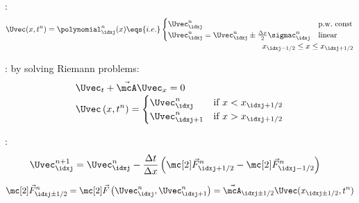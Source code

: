 \begin{defnbox}\nospacing
    \begin{defn}\label{defn:newline_finite_volume_scheme_for_linear_systems}\leavevmode\\
\begin{circlelistnosep}
    \item {}:
    \begin{align*}
      \Uvec(x,t^{n})=\polynomial_{\idxj}^{n}(x)
      \eqs{i.e.}
      \begin{cases}
        \Uvec_{\idxj}^{n}&\text{p.w.\ const}\\
        \Uvec_{\idxj}^{n}=\Uvec_{\idxj}^{n}\pm\frac{\Delta x}{2}\sigmac_{\idxj}^{n}&\text{linear}\\
    \end{cases}\\[-1\jot]
            x_{\idxj-1/2}\leq x \leq x_{\idxj+1/2}
    \end{align*}
    \item {}: by solving Riemann problems:
    \begin{align*}
          &\Uvec_{t}+\linfluxvec\Uvec_{x}=0 \\[-1\jot]
          &\Uvec\left(x,t^{n}\right)=
          \begin{cases}
              \Uvec_{\idxj}^{n}&\text{if }x<x_{\idxj+1/2}\\
              \Uvec_{\idxj+1}^{n}&\text{if }x>x_{\idxj+1/2}\\
          \end{cases}
    \end{align*}
    \item {}:
    \begin{align*}
      \Uvec_{\idxj}^{n+1}&=\Uvec_{\idxj}^{n}-\frac{\Delta t}{\Delta x}\left(\Fluxvec^{n}_{\idxj+1/2}-\Fluxvec^{n}_{\idxj-1/2}\right)
    \end{align*}
\end{circlelistnosep}
    \begin{align*}
        \Fluxvec^{n}_{\idxj\pm1/2}=\Fluxvec\left(\Uvec_{\idxj}^{n},\Uvec_{\idxj+1}^{n}\right)=\linfluxvec_{\idxj\pm1/2}\Uvec(x_{\idxj\pm1/2},t^{n})
    \end{align*}
    \end{defn}
\end{defnbox}
